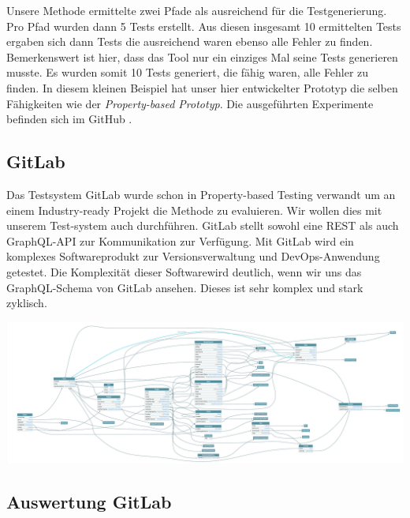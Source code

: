 
Unsere Methode ermittelte zwei Pfade als ausreichend für die Testgenerierung.
Pro Pfad wurden dann 5 Tests erstellt.
Aus diesen insgesamt 10 ermittelten Tests ergaben sich dann Tests die ausreichend waren ebenso alle Fehler zu finden.
Bemerkenswert ist hier, dass das Tool nur ein einziges Mal seine Tests generieren musste.
Es wurden somit 10 Tests generiert, die fähig waren, alle Fehler zu finden.
In diesem kleinen Beispiel hat unser hier entwickelter Prototyp die selben Fähigkeiten wie der \textit{Property-based Prototyp}.
Die ausgeführten Experimente befinden sich im GitHub \cite{github-toy-experimente}.

\subsection{GitLab}

Das Testsystem GitLab wurde schon in Property-based  Testing verwandt um an einem Industry-ready Projekt die Methode zu evaluieren.
Wir wollen dies mit unserem Test-system auch durchführen.
GitLab stellt sowohl eine REST als auch GraphQL-API zur Kommunikation  zur  Verfügung.
Mit GitLab wird ein komplexes Softwareprodukt zur Versionsverwaltung und DevOps-Anwendung getestet.
Die Komplexität dieser Softwarewird deutlich, wenn wir uns das GraphQL-Schema von GitLab ansehen.
Dieses ist sehr komplex und stark zyklisch.

\begin{center}
    \includegraphics[width=\textwidth,height=\textheight,keepaspectratio]{img/gitlabgraph}
\end{center}

\subsection{Auswertung GitLab}

